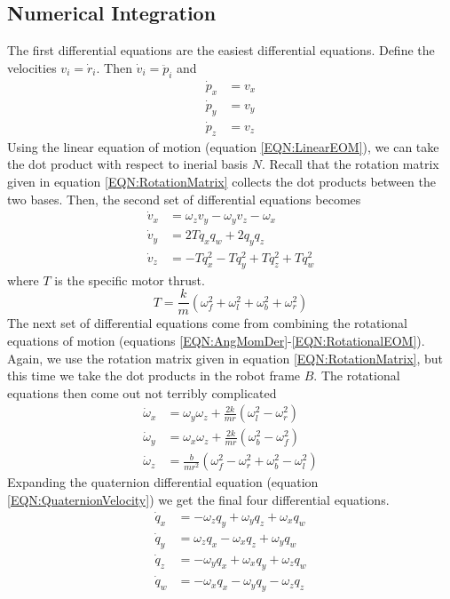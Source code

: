 \documentclass[lettersize,journal]{IEEEtran}
\begin{document}
\subsection{Numerical Integration}
The first differential equations are the easiest differential equations. Define the velocities $v_i = \dot{r}_i$. Then $\dot{v}_i=\ddot{p}_i$ and
\begin{align}
  \dot{p}_x &= v_x \label{EQN:VelocityX}\\
  \dot{p}_y &= v_y \\
  \dot{p}_z &= v_z \label{EQN:VelocityZ}
\end{align}
Using the linear equation of motion (equation \ref{EQN:LinearEOM}), we can take the dot product with respect to inerial basis $N$.
Recall that the rotation matrix given in equation \ref{EQN:RotationMatrix} collects the dot products between the two bases.
Then, the second set of differential equations becomes
\begin{align}
  \dot{v}_x &= \omega_zv_y-\omega_yv_z-\omega_x \\
  \dot{v}_y &= 2Tq_xq_w+2q_yq_z \\
  \dot{v}_z &= -Tq_x^2-Tq_y^2+Tq_z^2+Tq_w^2
\end{align}
where $T$ is the specific motor thrust.
\begin{equation}
  T = \frac{k}{m}\left(\omega_f^2 + \omega_l^2 + \omega_b^2 + \omega_r^2\right)
\end{equation}
The next set of differential equations come from combining the rotational equations of motion (equations \ref{EQN:AngMomDer}-\ref{EQN:RotationalEOM}).
Again, we use the rotation matrix given in equation \ref{EQN:RotationMatrix}, but this time we take the dot products in the robot frame $B$.
The rotational equations then come out not terribly complicated
\begin{align}
  \dot{\omega}_x &= \omega_y\omega_z+\frac{2k}{mr}\left(\omega_l^2-\omega_r^2\right) \\
  \dot{\omega}_y &= \omega_x\omega_z+\frac{2k}{mr}\left(\omega_b^2-\omega_f^2\right) \\
  \dot{\omega}_z &= \frac{b}{mr^2}\left(\omega_f^2-\omega_r^2+\omega_b^2-\omega_l^2\right)
\end{align}
Expanding the quaternion differential equation (equation  \ref{EQN:QuaternionVelocity}) we get the final four differential equations.
\begin{align}
  \dot{q}_x &= -\omega_z q_y + \omega_y q_z + \omega_x q_w \\
  \dot{q}_y &= \omega_z q_x - \omega_x q_z + \omega_y q_w  \\
  \dot{q}_z &= -\omega_y q_x + \omega_x q_y + \omega_z q_w \\
  \dot{q}_w &=- \omega_x q_x - \omega_y q_y - \omega_z q_z
\end{align}
\end{document}
